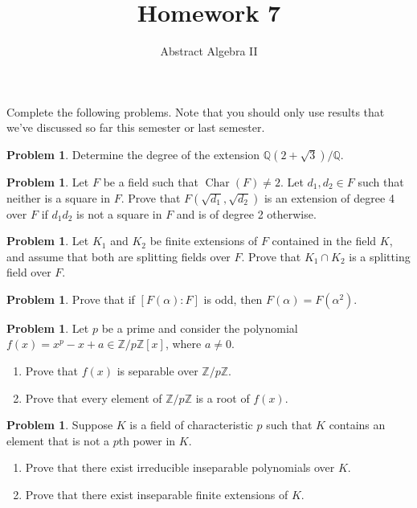 \documentclass[11pt]{scrartcl}
\theoremstyle{definition}
\newtheorem{problem}[theorem]{Problem}
\DeclareMathOperator{\Char}{Char}
\begin{document}
\title{Homework 7}
\subtitle{Abstract Algebra II}
\date{}

\maketitle
\thispagestyle{fancy}

Complete the following problems. Note that you should only use results that we've discussed so far this semester or last semester.

\begin{problem}
Determine the degree of the extension $\mathbb{Q}(2+\sqrt{3})/\mathbb{Q}$.
\end{problem}

\begin{problem}
Let $F$ be a field such that $\Char(F)\neq 2$.  Let $d_1,d_2\in F$ such that neither is a square in $F$. Prove that $F(\sqrt{d_1},\sqrt{d_2})$ is an extension of degree 4 over $F$ if $d_1d_2$ is not a square in $F$ and is of degree 2 otherwise.
\end{problem}

\begin{problem}
Let $K_1$ and $K_2$ be finite extensions of $F$ contained in the field $K$, and assume that both are splitting fields over $F$. Prove that $K_1\cap K_2$ is a splitting field over $F$.
\end{problem}

\begin{problem}
Prove that if $[F(\alpha):F]$ is odd, then $F(\alpha)=F(\alpha^2)$.
\end{problem}

\begin{problem}
Let $p$ be a prime and consider the polynomial $f(x)=x^p-x+a\in \mathbb{Z}/p\mathbb{Z}[x]$, where $a\neq 0$. 
\begin{enumerate}[label=\rm{(\alph*)}]
\item Prove that $f(x)$ is separable over $\mathbb{Z}/p\mathbb{Z}$.
\item Prove that every element of $\mathbb{Z}/p\mathbb{Z}$ is a root of $f(x)$.
\end{enumerate}
\end{problem}

\begin{problem}
Suppose $K$ is a field of characteristic $p$ such that $K$ contains an element that is not a $p$th power in $K$. 
\begin{enumerate}[label=\rm{(\alph*)}]
\item Prove that there exist irreducible inseparable polynomials over $K$.
\item Prove that there exist inseparable finite extensions of $K$.
\end{enumerate}
\end{problem}
\end{document}
